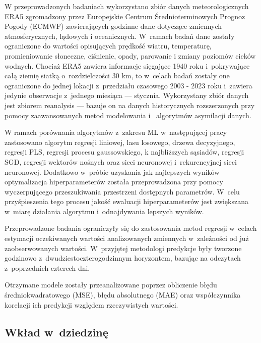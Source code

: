 W przeprowadzonych badaniach wykorzystano zbiór danych meteorologicznych ERA5
zgromadzony przez Europejskie Centrum Średnioterminowych Prognoz Pogody (ECMWF)
zawierających godzinne dane dotyczące zmiennych atmosferycznych, lądowych i
oceanicznych. W~ramach badań dane zostały ograniczone do wartości opisujących
prędkość wiatru, temperaturę, promieniowanie słoneczne, ciśnienie, opady, parowanie i
zmiany poziomów cieków wodnych. Chociaż ERA5 zawiera informacje sięgające 1940
roku i~pokrywające całą ziemię siatką o~rozdzielczości 30 km, 
to w~celach badań zostały one ograniczone do jednej lokacji z~przedziału czasowego 
2003 - 2023 roku i~zawiera jedynie obserwacje z~jednego miesiąca — stycznia. 
Wykorzystany zbiór danych jest zbiorem reanalysis — bazuje on na 
danych historycznych rozszerzonych przy pomocy zaawansowanych metod modelowania i~
algorytmów asymilacji danych.

W ramach porównania algorytmów z~zakresu ML w~następującej pracy zastosowano
algorytm regresji liniowej, lasu losowego, drzewa decyzyjnego, regresji PLS, 
regresji procesu gaussowskiego, k najbliższych sąsiadów, regresji SGD, 
regresji wektorów nośnych oraz sieci neuronowej i~rekurencyjnej sieci neuronowej. 
Dodatkowo w~próbie uzyskania jak najlepszych wyników optymalizacja hiperparameterów
została przeprowadzona przy pomocy wyczerpującego przeszukiwania przestrzeni 
dostępnych parametrów. W~celu przyśpieszenia tego procesu jakość ewaluacji 
hiperparameterów jest zwiększana w~miarę działania algorytmu i~odnajdywania lepszych
wyników.

Przeprowadzone badania ograniczyły się do zastosowania metod regresji w~celach
estymacji oczekiwanych wartości analizowanych zmiennych w~zależności
od już zaobserwowanych wartości. W~przyjętej metodologi predykcje były tworzone
godzinowo z~dwudziestoczterogodzinnym horyzontem, bazując na odczytach z~poprzednich
czterech dni.

Otrzymane modele zostały przeanalizowane poprzez obliczenie błędu 
średniokwadratowego (MSE), błędu absolutnego (MAE) oraz współczynnika korelacji
ich predykcji względem rzeczywistych wartości.

\subsection*{Wkład w~dziedzinę}\label{subsec:impact}

